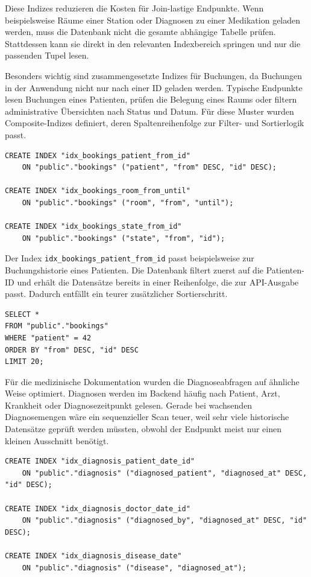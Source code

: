 Diese Indizes reduzieren die Kosten für Join-lastige Endpunkte. Wenn beispielsweise Räume einer Station oder Diagnosen zu einer Medikation geladen werden, muss die Datenbank nicht die gesamte abhängige Tabelle prüfen. Stattdessen kann sie direkt in den relevanten Indexbereich springen und nur die passenden Tupel lesen.

Besonders wichtig sind zusammengesetzte Indizes für Buchungen, da Buchungen in der Anwendung nicht nur nach einer ID geladen werden. Typische Endpunkte lesen Buchungen eines Patienten, prüfen die Belegung eines Raums oder filtern administrative Übersichten nach Status und Datum. Für diese Muster wurden Composite-Indizes definiert, deren Spaltenreihenfolge zur Filter- und Sortierlogik passt.

\begin{lstlisting}[style=sqlstyle, caption={Composite-Indizes für Buchungs-Endpunkte}]
CREATE INDEX "idx_bookings_patient_from_id"
    ON "public"."bookings" ("patient", "from" DESC, "id" DESC);

CREATE INDEX "idx_bookings_room_from_until"
    ON "public"."bookings" ("room", "from", "until");

CREATE INDEX "idx_bookings_state_from_id"
    ON "public"."bookings" ("state", "from", "id");
\end{lstlisting}

Der Index \texttt{idx\_bookings\_patient\_from\_id} passt beispielsweise zur Buchungshistorie eines Patienten. Die Datenbank filtert zuerst auf die Patienten-ID und erhält die Datensätze bereits in einer Reihenfolge, die zur API-Ausgabe passt. Dadurch entfällt ein teurer zusätzlicher Sortierschritt.

\begin{lstlisting}[style=sqlstyle, caption={Typische Abfrage auf die Buchungshistorie eines Patienten}]
SELECT *
FROM "public"."bookings"
WHERE "patient" = 42
ORDER BY "from" DESC, "id" DESC
LIMIT 20;
\end{lstlisting}

Für die medizinische Dokumentation wurden die Diagnoseabfragen auf ähnliche Weise optimiert. Diagnosen werden im Backend häufig nach Patient, Arzt, Krankheit oder Diagnosezeitpunkt gelesen. Gerade bei wachsenden Diagnosemengen wäre ein sequenzieller Scan teuer, weil sehr viele historische Datensätze geprüft werden müssten, obwohl der Endpunkt meist nur einen kleinen Ausschnitt benötigt.

\begin{lstlisting}[style=sqlstyle, caption={Composite-Indizes für Diagnose-Endpunkte}]
CREATE INDEX "idx_diagnosis_patient_date_id"
    ON "public"."diagnosis" ("diagnosed_patient", "diagnosed_at" DESC, "id" DESC);

CREATE INDEX "idx_diagnosis_doctor_date_id"
    ON "public"."diagnosis" ("diagnosed_by", "diagnosed_at" DESC, "id" DESC);

CREATE INDEX "idx_diagnosis_disease_date"
    ON "public"."diagnosis" ("disease", "diagnosed_at");
\end{lstlisting}

